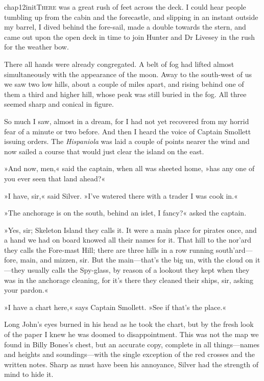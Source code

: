 
   \lettrine[lines=4,image=true]{chap12initT}{here} was a great rush of feet across the deck. I could hear people tumbling up from the cabin and the forecastle, and slipping in an instant outside my barrel, I dived behind the fore-sail, made a double towards the stern, and came out upon the open deck in time to join Hunter and Dr Livesey in the rush for the weather bow.

There all hands were already congregated. A belt of fog had lifted almost simultaneously with the appearance of the moon. Away to the south-west of us we saw two low hills, about a couple of miles apart, and rising behind one of them a third and higher hill, whose peak was still buried in the fog. All three seemed sharp and conical in figure.

So much I saw, almost in a dream, for I had not yet recovered from my horrid fear of a minute or two before. And then I heard the voice of Captain Smollett issuing orders. The \textit{Hispaniola} was laid a couple of points nearer the wind and now sailed a course that would just clear the island on the east.

»And now, men,« said the captain, when all was sheeted home, »has any one of you ever seen that land ahead?«

»I have, sir,« said Silver. »I've watered there with a trader I was cook in.«

»The anchorage is on the south, behind an islet, I fancy?« asked the captain.

»Yes, sir; Skeleton Island they calls it. It were a main place for pirates once, and a hand we had on board knowed all their names for it. That hill to the nor'ard they calls the Fore-mast Hill; there are three hills in a row running south'ard—fore, main, and mizzen, sir. But the main—that's the big un, with the cloud on it—they usually calls the Spy-glass, by reason of a lookout they kept when they was in the anchorage cleaning, for it's there they cleaned their ships, sir, asking your pardon.«

»I have a chart here,« says Captain Smollett. »See if that's the place.«

Long John's eyes burned in his head as he took the chart, but by the fresh look of the paper I knew he was doomed to disappointment. This was not the map we found in Billy Bones's chest, but an accurate copy, complete in all things—names and heights and soundings—with the single exception of the red crosses and the written notes. Sharp as must have been his annoyance, Silver had the strength of mind to hide it.

